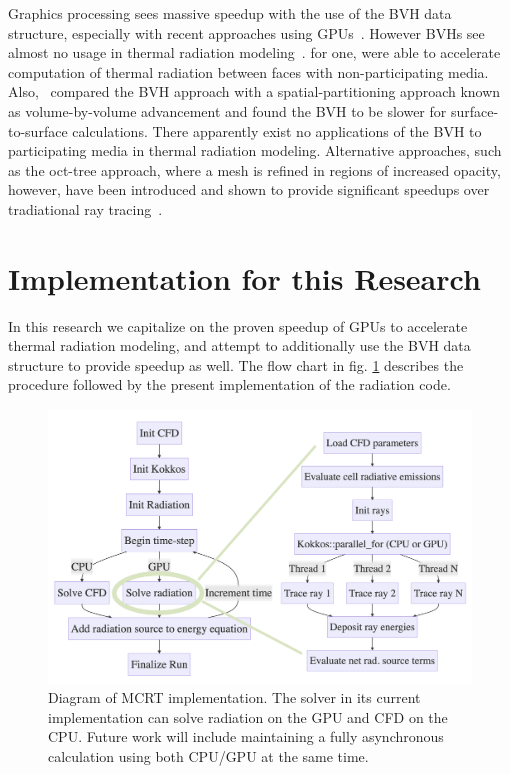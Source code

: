 Graphics processing sees massive speedup with the use of the BVH data structure, especially with recent approaches using GPUs~\cite{Nery2013ParallelGPGPUs,Meister2021ATracing,Karras2012MaximizingTrees}.
However BVHs see almost no usage in thermal radiation modeling~\cite{Liu2020TheFlames}.
\citet{Kuczynskia2014RadiationBoundaries} for one, were able to accelerate computation of thermal radiation between faces with non-participating media. 
Also,~\citet{Mazumder2006MethodsTransport} compared the BVH approach with a spatial-partitioning approach known as volume-by-volume advancement and found the BVH to be slower for surface-to-surface calculations. 
There apparently exist no applications of the BVH to participating media in thermal radiation modeling. Alternative approaches, such as the oct-tree approach, where a mesh is refined in regions of increased opacity, however, have been introduced and shown to provide significant speedups over tradiational ray tracing~\cite{Saftly2013UsingNote,Villefranque2019AAtmospheres}.

\section{Implementation for this Research} \label{section:ModelForThisStudy}
In this research we capitalize on the proven speedup of GPUs to accelerate thermal radiation modeling, and attempt to additionally use the BVH data structure to provide speedup as well.
The flow chart in fig. \ref{fig:joint_flow_chart} describes the procedure followed by the present implementation of the radiation code.

\begin{figure}
  \centering
  \includegraphics[width=0.8\linewidth]{figures/ch3/joint_flow_chart.png}
  \caption{Diagram of MCRT implementation. The solver in its current implementation can solve radiation on the GPU and CFD on the CPU. Future work will include maintaining a fully asynchronous calculation using both CPU/GPU at the same time.}
  \label{fig:joint_flow_chart}
\end{figure}

